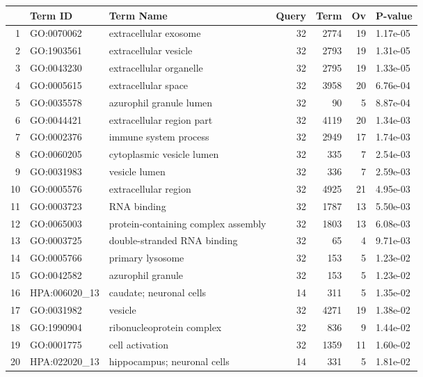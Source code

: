 \begin{tabular}{rllrrrl}
  \hline
 & Term ID & Term Name & Query & Term & Ov & P-value \\ 
  \hline
1 & GO:0070062 & extracellular exosome &  32 & 2774 &  19 & 1.17e-05 \\ 
  2 & GO:1903561 & extracellular vesicle &  32 & 2793 &  19 & 1.31e-05 \\ 
  3 & GO:0043230 & extracellular organelle &  32 & 2795 &  19 & 1.33e-05 \\ 
  4 & GO:0005615 & extracellular space &  32 & 3958 &  20 & 6.76e-04 \\ 
  5 & GO:0035578 & azurophil granule lumen &  32 &  90 &   5 & 8.87e-04 \\ 
  6 & GO:0044421 & extracellular region part &  32 & 4119 &  20 & 1.34e-03 \\ 
  7 & GO:0002376 & immune system process &  32 & 2949 &  17 & 1.74e-03 \\ 
  8 & GO:0060205 & cytoplasmic vesicle lumen &  32 & 335 &   7 & 2.54e-03 \\ 
  9 & GO:0031983 & vesicle lumen &  32 & 336 &   7 & 2.59e-03 \\ 
  10 & GO:0005576 & extracellular region &  32 & 4925 &  21 & 4.95e-03 \\ 
  11 & GO:0003723 & RNA binding &  32 & 1787 &  13 & 5.50e-03 \\ 
  12 & GO:0065003 & protein-containing complex assembly &  32 & 1803 &  13 & 6.08e-03 \\ 
  13 & GO:0003725 & double-stranded RNA binding &  32 &  65 &   4 & 9.71e-03 \\ 
  14 & GO:0005766 & primary lysosome &  32 & 153 &   5 & 1.23e-02 \\ 
  15 & GO:0042582 & azurophil granule &  32 & 153 &   5 & 1.23e-02 \\ 
  16 & HPA:006020\_13 & caudate; neuronal cells &  14 & 311 &   5 & 1.35e-02 \\ 
  17 & GO:0031982 & vesicle &  32 & 4271 &  19 & 1.38e-02 \\ 
  18 & GO:1990904 & ribonucleoprotein complex &  32 & 836 &   9 & 1.44e-02 \\ 
  19 & GO:0001775 & cell activation &  32 & 1359 &  11 & 1.60e-02 \\ 
  20 & HPA:022020\_13 & hippocampus; neuronal cells &  14 & 331 &   5 & 1.81e-02 \\ 
   \hline
\end{tabular}
